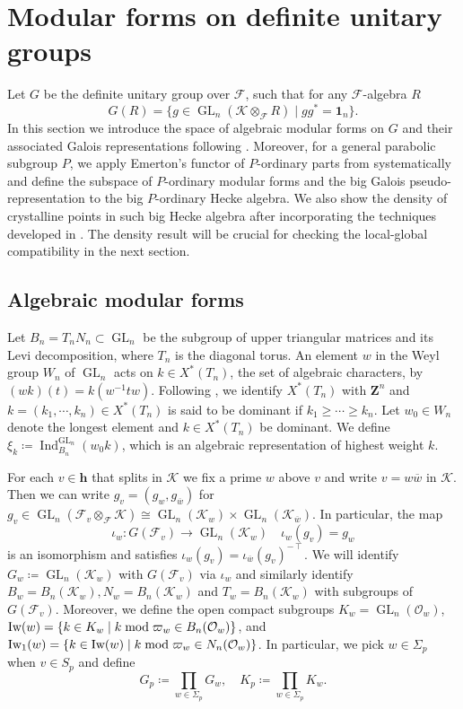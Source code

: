\documentclass[leqno]{amsart}
\theoremstyle{definition}
\theoremstyle{remark}
\newcommand{\id}{\mathbf{1}}
\newcommand{\oo}{\mathcal{O}}
\newcommand{\Z}{{\mathbf{Z}}}
\newcommand{\finite}{\mathbf{h}}
\DeclareMathOperator{\Ind}{Ind}
\DeclareMathOperator{\GL}{GL}
\newcommand{\F}{{\mathcal{F}}} %
\newcommand{\K}{{\mathcal{K}}} %
\newcommand{\bw}{{\overline{w}}}
\newcommand{\Iw}{\textnormal{Iw}} %
\begin{document}
\section{Modular forms on definite unitary groups}

Let $G$ be the definite unitary group over $\F$,
such that for any $\F$-algebra $R$
\begin{equation}\label{def:def_unitary}
    G(R)=\{g\in \GL_{n}(\K\otimes_\F R) \mid gg^*=\id_n\}.
\end{equation}
In this section we introduce
the space of algebraic modular forms on $G$
and their associated Galois representations
following \cite{ger}.
Moreover, for a general parabolic subgroup $P$,
we apply Emerton's functor of $P$-ordinary parts from \cite{emeI}
systematically and define 
the subspace of $P$-ordinary modular forms
and the big Galois pseudo-representation to 
the big $P$-ordinary Hecke algebra.
We also show the density of crystalline points 
in such big Hecke algebra
after incorporating the techniques developed in \cite{pan}.
The density result will be crucial for checking
the local-global compatibility in the next section.


\subsection{Algebraic modular forms}

Let $B_n=T_nN_n\subset \GL_n$ be the subgroup of
upper triangular matrices and its Levi decomposition,
where $T_n$ is the diagonal torus.
An element $w$ in the Weyl group $W_n$ of $\GL_n$
acts on $k\in X^*(T_n)$, the set of algebraic characters,
by $(wk)(t)=k(w^{-1}tw)$.
Following \cite[Def 2.3]{ger},
we identify $X^*(T_n)$ with $\Z^n$
and $k=(k_1,\cdots,k_n)\in X^*(T_n)$
is said to be dominant if $k_1\geq \cdots\geq k_n$.
Let $w_0\in W_n$ denote the longest element
and $k\in X^*(T_n)$ be dominant.
We define $\xi_k\coloneqq \Ind_{B_n}^{\GL_n}(w_0k)$,
which is an algebraic representation 
of highest weight $k$.

For each $v\in\finite$ that splits in $\K$
we fix a prime $w$ above $v$
and write $v=w\bw$ in $\K$.
Then we can write $g_v=(g_w,g_{\bw})$
for $g_v\in \GL_n(\F_v\otimes_\F\K)
\cong \GL_n(\K_w)\times\GL_n(\K_{\bw})$.
In particular, the map
\begin{equation}
\iota_w\colon G(\F_v)\to \GL_n(\K_w)\quad
\iota_w(g_v)=g_w
\end{equation}
is an isomorphism and satisfies
$\iota_w(g_v)=\iota_{\bw}(g_v)^{-\intercal}$.
We will identify $G_w\coloneqq\GL_n(\K_w)$
with $G(\F_v)$ via $\iota_w$
and similarly identify 
$B_w=B_n(\K_w), N_w=B_n(\K_w)$ and
$T_w=B_n(\K_w)$
with subgroups of $G(\F_v)$.
Moreover, we define the open 
compact subgroups
$K_w=\GL_n(\oo_w)$,
$\Iw(w)=\{k\in K_w\mid k\bmod \varpi_w\in B_n(\oo_w)\}$, and
$\Iw_1(w)=\{k\in \Iw(w)\mid k\bmod \varpi_w\in N_n(\oo_w)\}$.
In particular, we pick $w\in \Sigma_p$ when $v\in S_p$ and define
\[
	G_p\coloneqq\prod_{w\in \Sigma_p}G_w,\quad
	K_p\coloneqq\prod_{w\in \Sigma_p}K_w.
\]
\end{document}
